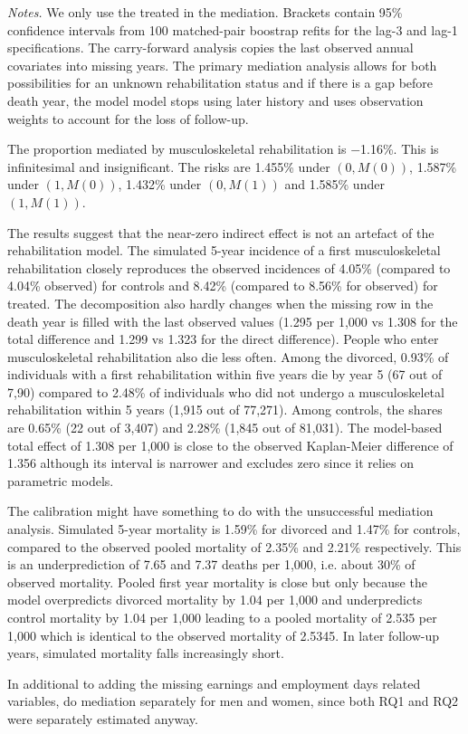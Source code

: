 \documentclass[a4paper,12pt]{article}
\theoremstyle{plain}
\theoremstyle{definition}
\theoremstyle{TheoremNum}
\theoremstyle{CorollaryNum}
\theoremstyle{PropositionNum}
\theoremstyle{TheoremNum}
\begin{document}
\begin{table}[H]
\begin{minipage}{\textwidth}
\footnotesize
\vspace{0.5em}
\textit{Notes.} We only use the treated in the mediation. Brackets contain 95\% confidence intervals from 100 matched-pair boostrap refits for the lag-3 and lag-1 specifications. The carry-forward analysis copies the last observed annual covariates into missing years. The primary mediation analysis allows for both possibilities for an unknown rehabilitation status and if there is a gap before death year, the model model stops using later history and uses observation weights to account for the loss of follow-up.
\end{minipage}
\end{table}

The proportion mediated by musculoskeletal rehabilitation is $-$1.16\%. This is infinitesimal and insignificant. The risks are 1.455\% under $(0, M(0))$, 1.587\% under $(1, M(0))$, 1.432\% under $(0,M(1))$ and 1.585\% under $(1, M(1))$.

The results suggest that the near-zero indirect effect is not an artefact of the rehabilitation model. The simulated 5-year incidence of a first musculoskeletal rehabilitation closely reproduces the observed incidences of 4.05\% (compared to 4.04\% observed) for controls and 8.42\% (compared to 8.56\% for observed) for treated. The decomposition also hardly changes when the missing row in the death year is filled with the last observed values (1.295 per 1,000 vs 1.308 for the total difference and 1.299 vs 1.323 for the direct difference). People who enter musculoskeletal rehabilitation also die less often. Among the divorced, 0.93\% of individuals with a first rehabilitation within five years die by year 5 (67 out of 7,90) compared to 2.48\% of individuals who did not undergo a musculoskeletal rehabilitation within 5 years (1,915 out of 77,271). Among controls, the shares are 0.65\% (22 out of 3,407) and 2.28\% (1,845 out of 81,031). The model-based total effect of 1.308 per 1,000 is close to the observed Kaplan-Meier difference of 1.356 although its interval is narrower and excludes zero since it relies on parametric models. 


{\color{blue}

The calibration might have something to do with the unsuccessful mediation analysis. Simulated 5-year mortality is 1.59\% for divorced and 1.47\% for controls, compared to the observed pooled mortality of 2.35\% and 2.21\% respectively. This is an underprediction of 7.65 and 7.37 deaths per 1,000, i.e. about 30\% of observed mortality. Pooled first year mortality is close but only because the model overpredicts divorced mortality by 1.04 per 1,000 and underpredicts control mortality by 1.04 per 1,000 leading to a pooled mortality of 2.535 per 1,000 which is identical to the observed mortality of 2.5345. In later follow-up years, simulated mortality falls increasingly short. 

In additional to adding the missing earnings and employment days related variables, do mediation separately for men and women, since both RQ1 and RQ2 were separately estimated anyway.}
\end{document}
